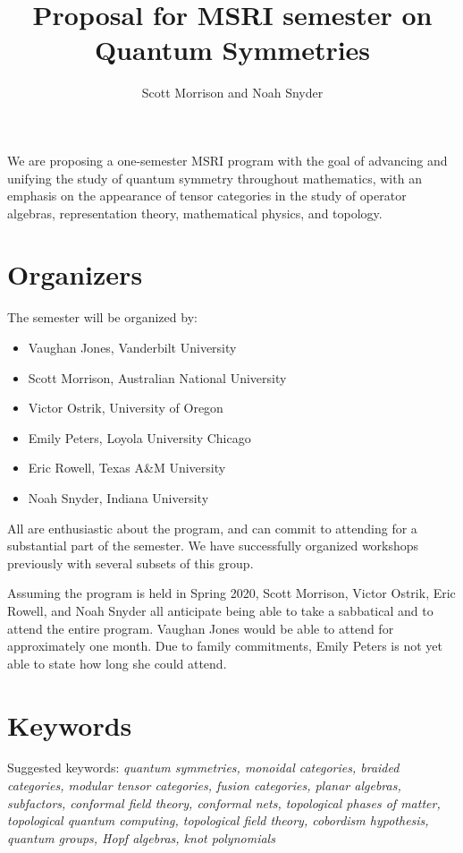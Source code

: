 \documentclass[12pt]{article}
\title{Proposal for MSRI semester on \textbf{Quantum Symmetries}}
\author{Scott Morrison and Noah Snyder}
\begin{document}
\maketitle



We are proposing a one-semester MSRI program with the goal of advancing and unifying the study of quantum symmetry throughout mathematics, with an emphasis on the appearance of tensor categories in the study of operator algebras, representation theory, mathematical physics, and topology.

\section{Organizers}
The semester will be organized by:
\begin{itemize}
  \setlength{\itemsep}{1pt}
  \setlength{\parskip}{0pt}
  \setlength{\parsep}{0pt}
\item Vaughan Jones, Vanderbilt University
\item Scott Morrison, Australian National University
\item Victor Ostrik, University of Oregon
\item Emily Peters, Loyola University Chicago
\item Eric Rowell, Texas A\&M University
\item Noah Snyder, Indiana University
\end{itemize}
All are enthusiastic about the program, and can commit to attending for a substantial part of the semester. We have successfully organized workshops previously with several subsets of this group.

Assuming the program is held in Spring 2020, Scott Morrison, Victor Ostrik, Eric Rowell, and  Noah Snyder all anticipate being able to take a sabbatical and to attend the entire program. Vaughan Jones would be able to attend for approximately one month. Due to family commitments, Emily Peters is not yet able to state how long she could attend.

\section{Keywords}
Suggested keywords:
\emph{
quantum symmetries, monoidal categories, braided categories, modular tensor categories, fusion categories, planar algebras, subfactors, conformal field theory, conformal nets, topological phases of matter, topological quantum computing, topological field theory, cobordism hypothesis, quantum groups, Hopf algebras, knot polynomials}
\end{document}
